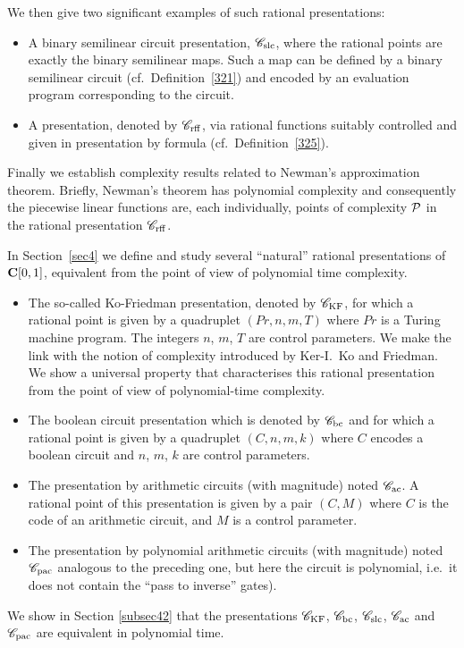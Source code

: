 We then give two significant examples of such rational presentations:
\begin{itemize}

\item 
A binary semilinear circuit presentation, ${{{\mathscr C}}_{\rm slc}}$, where the rational points are exactly the binary semilinear maps. Such a map can be defined by a binary semilinear circuit (cf.\ Definition~\ref{321}) and encoded by an evaluation program corresponding to the circuit.

\item 
A presentation, denoted by ${{{\mathscr C}}_{\rm rff}}$, via rational functions suitably controlled and given in presentation by formula (cf.\ Definition~\ref{325}).
\end{itemize}
Finally we establish complexity results related to Newman's approximation theorem. 
Briefly, Newman's theorem has polynomial complexity and consequently the piecewise linear functions are, each individually, points of complexity ${\cal P}$ in the rational presentation ${{{\mathscr C}}_{\rm rff}}$.


\medskip In Section~\ref{sec4} we define and study several ``natural'' rational presentations of ${{\bf C}[0,1]}$, equivalent from the point of view of polynomial time complexity.
\begin{itemize}
\item 

The so-called Ko-Friedman presentation, denoted by ${{{\mathscr C}}_{\rm KF}}$, for which a rational point is given by a quadruplet $(Pr, n, m, T)$ where $Pr$ is a Turing machine program. The integers $n$, $m$, $T$ are control parameters. We make the link with the notion of complexity introduced by Ker-I.\ Ko and Friedman. We show a universal property that characterises this rational presentation from the point of view of polynomial-time complexity.

\item 

The boolean circuit presentation which is denoted by ${{{\mathscr C}}_{\rm bc}}$ and for which a rational point is given by a quadruplet $(C,n,m,k)$ where $C$ encodes a boolean circuit and $n$, $m$, $k$ are control parameters.

\item 

The presentation by arithmetic circuits (with magnitude) noted ${{{\mathscr C}}_{\rm ac}}$. A rational point of this presentation is given by a pair $(C,M)$ where $C$ is the code of an arithmetic circuit, and $M$ is a control parameter.

\item 
The presentation by polynomial arithmetic circuits (with magnitude) noted ${{{\mathscr C}}_{\rm pac}}$ analogous to the preceding one, but here the circuit is polynomial, i.e.\ it does not contain the ``pass to inverse'' gates). 
\end{itemize}
We show in Section \ref{subsec42} that the presentations ${{{\mathscr C}}_{\rm KF}}$, ${{{\mathscr C}}_{\rm bc}}$, ${{{\mathscr C}}_{\rm slc}}$, ${{{\mathscr C}}_{\rm ac}}$ and ${{{\mathscr C}}_{\rm pac}}$ are equivalent in polynomial time. 


